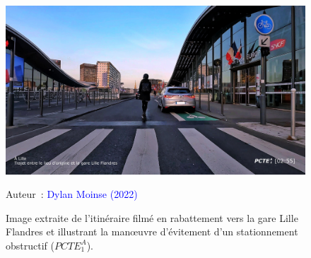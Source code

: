 \begin{refsegment}
    \begin{figure}[h!]\vspace*{4pt}
        \caption{Image extraite de l'itinéraire filmé en rabattement vers la gare Lille Flandres et illustrant la manœuvre d'évitement d'un stationnement obstructif (\(PCTE^{A}_{1}\)).}
        \label{fig-chap4:pcte1a-stationnement-genant}
        \centerline{\includegraphics[width=1\columnwidth]{src/Figures/Chap-4/Extrait_Video_PCTE1_Access_8.jpg}}
        \vspace{5pt}
        \begin{flushright}\scriptsize{
        Auteur~: \textcolor{blue}{Dylan Moinse (2022)}
        }\end{flushright}
    \end{figure}


\end{refsegment}
